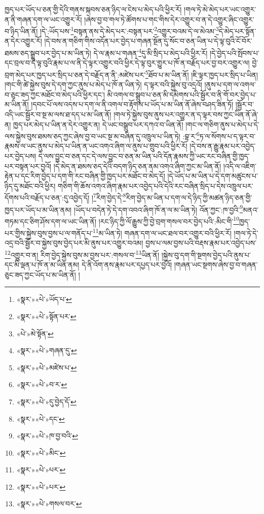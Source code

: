 ཁྱད་པར་ཡོད་པ་ཅན་གྱི་དེའི་གནས་སྐབས་ཅན་ཉིད་ལ་ངེས་པ་མེད་པའི་ཕྱིར་རོ། །གལ་ཏེ་མེ་མེད་པར་ཡང་འགྱུར་ན་ནི་གཞན་དག་ལ་ཡང་འགྱུར་རོ། །ཞེས་བྱ་བ་གལ་ཏེ་ཚོགས་པ་གང་གིས་དེར་འགྱུར་བ་ན་དེ་འགྱུར་ཞིང་འགྱུར་བ་ཉིད་ཡིན་ནོ། །དེ་:ཡོད་པས་\footnote{«སྣར་»«པེ་»ཡོད་པ་}བསྟན་ནས་དེ་མེད་པར་:བསྟན་པར་\footnote{«སྣར་»«པེ་»སྟོན་པར་}འགྱུར་བའམ་དེ་ལ་མེའམ་\footnote{«པེ་»མེ་སྟོན་}དེ་མེད་པར་སྟོན་ན་དེར་འགྱུར་རོ། །དེ་བས་ན་གཅིག་གིས་འདོན་པར་བྱེད་པ་གཞན་སྔོན་དུ་སོང་བ་ཅན་ཡིན་པ་དེ་ལྟ་བུའི་ངོ་བོར་ཐམས་ཅད་སྒྲུབ་པར་བྱེད་པ་མ་ཡིན་ཏེ། དེ་ལ་རྣམ་པ་གཞན་\footnote{«སྣར་»«པེ་»གཞན་དུ་}དུ་མི་སྲིད་པ་མེད་པའི་ཕྱིར་རོ། །དེ་བྱེད་པའི་སྤོབས་པ་དང་བྲལ་བ་དེ་ལྟ་བུའི་རྣམ་པ་ལ་ནི་དེ་ལྟར་འགྱུར་བའི་ཕྱིར་དེ་ལྟ་བུར་གྱུར་པ་ཁོ་ན་བརྗོད་པར་བྱ་བར་འགྱུར་ལ། བྱེ་བྲག་མེད་པར་ཁྱད་པར་སྲིད་པ་ཅན་དེ་བརྗོད་ན་ནི་:མཛེས་པར་\footnote{«སྣར་»«པེ་»མཛེས་པ་}ཐོབ་པ་མ་ཡིན་ནོ། །ཇི་ལྟར་ཁྱད་པར་སྲིད་པ་ཡིན། །གང་གི་ཚེ་སྐྱེས་བུས་དེ་དག་ཀྱང་ནུས་པ་མེད་པ་ཁོ་ན་ཡིན་ཏེ། ད་ལྟར་བའི་སྐྱེས་བུ་འདྲའོ། །ནུས་པ་དག་ལ་འགལ་བ་ཅུང་ཟད་ཀྱང་མཐོང་བ་མེད་པའི་ཕྱིར་དང་། མི་འགལ་བ་སྒྲུབ་པ་ཅན་མི་དམིགས་པའི་སྦྱོར་བ་ནི་གོ་བར་བྱེད་པ་མ་ཡིན་ནོ། །དབང་པོ་ལས་འདས་པ་དག་ལ་ནི་འགལ་བ་རྟོགས་པ་ཡོད་པ་མ་ཡིན་ནོ་ཞེས་བཤད་ཟིན་ཏོ། །སྦྱོར་བ་འདི་ཡང་སྦྱོར་བ་སྔ་མ་ལས་ཐ་དད་པ་མ་ཡིན་ནོ། །གལ་ཏེ་སྐྱེས་བུས་ནུས་པར་འགྱུར་ན་ད་ལྟར་བས་ཀྱང་ཡིན་ནོ་ཞེ་ན། ཁྱད་པར་མེད་པ་ཡིན་ན་དེར་འགྱུར་ན། དེ་ཡང་བསྒྲུབ་པར་དཀའ་བ་ཡིན་ནོ། །གང་ལ་གཅིག་ནུས་པ་མེད་པ་དེ་ལས་སྐྱེས་བུས་ཐམས་ཅད་ཀྱང་ཞེས་བྱ་བ་ཡང་སྔ་མ་བཞིན་དུ་འཁྲུལ་པ་ཡིན་ཏེ། :བྷ་ར་\footnote{«སྣར་»«པེ་»བ་ར་}ཏ་ལ་སོགས་པ་ད་ལྟར་བ་རྣམས་ལ་ཡང་ནུས་པ་མེད་པ་ཡིན་ན་ཡང་འགའ་ཞིག་ལ་ནུས་པ་གྲུབ་པའི་ཕྱིར་རོ། །དེ་བས་ན་རྒྱུ་རྣམ་པར་འབྱེད་པར་བྱེད་པས། དེ་ལས་བྱུང་བ་ཅན་དང་དེ་ལས་བྱུང་བ་ཅན་མ་ཡིན་པའི་དོན་རྣམས་ཀྱི་ཡང་རང་བཞིན་གྱི་ཁྱད་པར་བསྟན་པར་བྱའོ། །དེ་མེད་ན་ཐམས་ཅད་དེའི་བདག་ཉིད་ཅན་ནམ་འགའ་ཞིག་ཀྱང་མ་ཡིན་ནོ། །འདི་ལ་འཇིག་རྟེན་པ་དང་རིག་བྱེད་པ་དག་གི་རང་བཞིན་གྱི་ཁྱད་པར་མཐོང་བ་མེད་དོ། །དེ་ཡོད་པ་མ་ཡིན་པ་དེ་དག་མཚུངས་པ་ཉིད་དུ་མཐོང་བའི་ཕྱིར། གཅིག་གི་ཆོས་འགའ་ཞིག་རྣམ་པར་འབྱེད་པའི་དེའི་རང་བཞིན་སྲིད་པ་དེས་འཁྲུལ་པར་དོགས་པའི་བརྗོད་པ་ཅན་:དུ་འབྱེད་དོ། །\footnote{«སྣར་»«པེ་»དུ་བྱེད་དོ་}རིག་བྱེད་དེ་\footnote{«སྣར་»«པེ་»དང་}རིག་བྱེད་མ་ཡིན་པ་དག་ལ་དེ་ཉིད་ཀྱི་མཚན་ཉིད་ཅན་གྱི་ཁྱད་པར་ཡོད་པ་མ་ཡིན་ནམ། །ཡོད་པ་བདེན་ཏེ་དེ་དག་འབའ་ཞིག་ཁོ་ན་ལ་མ་ཡིན་ཏེ། འོན་ཀྱང་:ཁ་བྱའི་\footnote{«སྣར་»«པེ་»ཁ་བྱ་བའི་}མནའ་གཏམ་དང་ཅིག་ཤོས་དག་ལ་ཡང་ཡིན་ནོ། །རང་ཉིད་ཀྱི་ལོ་རྒྱུས་ཀྱི་བྱེ་བྲག་གསལ་བར་བྱེད་པའི་:མིང་གི་\footnote{«སྣར་»«པེ་»མིང་}ཁྱད་པར་གྱིས་སྐྱེས་བུས་བྱས་པ་ལ་གནོད་པ་\footnote{«སྣར་»«པེ་»པར་}མ་ཡིན་ཏེ། གཞན་དག་ལ་ཡང་ཐལ་བར་འགྱུར་བའི་ཕྱིར་རོ། །གལ་ཏེ་དེ་འདྲ་བའི་སྦྱོར་བ་སྐྱེས་བུས་བྱེད་པར་མི་ནུས་པར་འགྱུར་བའམ། བྱས་པ་ལམ་བྱས་པའི་བརྡས་རྣམ་པར་འབྱེད་པས་\footnote{«སྣར་»«པེ་»པར་}འགྱུར་བ་ན། རིག་བྱེད་སྐྱེས་བུས་མ་བྱས་པར་:གསལ་བ་\footnote{«སྣར་»«པེ་»གསལ་བར་}ཡིན་ནོ། །སྐྱེས་བུ་དག་གི་སྔགས་བྱེད་པའི་ནུས་པ་དང་མི་ལྡན་པ་ཁོ་ན་མ་ཡིན་ནམ། དེ་ནི་འོག་ནས་རྣམ་པར་དཔྱད་པར་བྱའོ། །གཞན་ཡང་སྔགས་ཞེས་བྱ་བ་གཞན་ཅུང་ཟད་ཀྱང་ཡོད་པ་མ་ཡིན་ནོ། །
